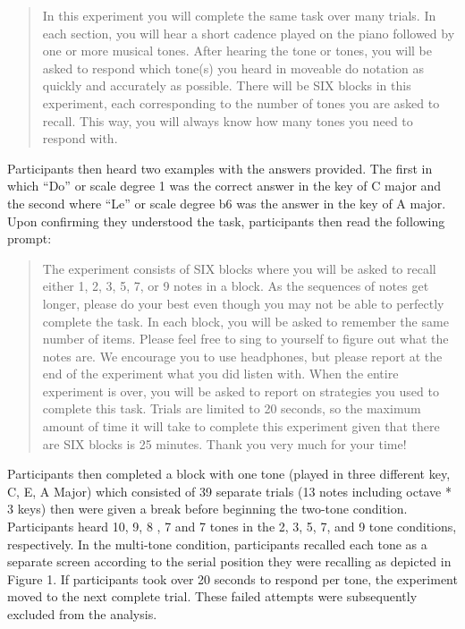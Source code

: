 \documentclass[english,man]{apa6}
\begin{document}
\begin{quote}
In this experiment you will complete the same task over many trials. In each section, you will hear a short cadence played on the piano followed by one or more musical tones. After hearing the tone or tones, you will be asked to respond which tone(s) you heard in moveable do notation as quickly and accurately as possible. There will be SIX blocks in this experiment, each corresponding to the number of tones you are asked to recall. This way, you will always know how many tones you need to respond with.
\end{quote}

Participants then heard two examples with the answers provided.
The first in which \enquote{Do} or scale degree 1 was the correct answer in the key of C major and the second where \enquote{Le} or scale degree b6 was the answer in the key of A major.
Upon confirming they understood the task, participants then read the following prompt:

\begin{quote}
The experiment consists of SIX blocks where you will be asked to recall either 1, 2, 3, 5, 7, or 9 notes in a block. As the sequences of notes get longer, please do your best even though you may not be able to perfectly complete the task. In each block, you will be asked to remember the same number of items. Please feel free to sing to yourself to figure out what the notes are. We encourage you to use headphones, but please report at the end of the experiment what you did listen with. When the entire experiment is over, you will be asked to report on strategies you used to complete this task. Trials are limited to 20 seconds, so the maximum amount of time it will take to complete this experiment given that there are SIX blocks is 25 minutes. Thank you very much for your time!
\end{quote}

Participants then completed a block with one tone (played in three different key, C, E, A Major) which consisted of 39 separate trials (13 notes including octave * 3 keys) then were given a break before beginning the two-tone condition.
Participants heard 10, 9, 8 , 7 and 7 tones in the 2, 3, 5, 7, and 9 tone conditions, respectively.
In the multi-tone condition, participants recalled each tone as a separate screen according to the serial position they were recalling as depicted in Figure 1.
If participants took over 20 seconds to respond per tone, the experiment moved to the next complete trial. These failed attempts were subsequently excluded from the analysis.
\end{document}
